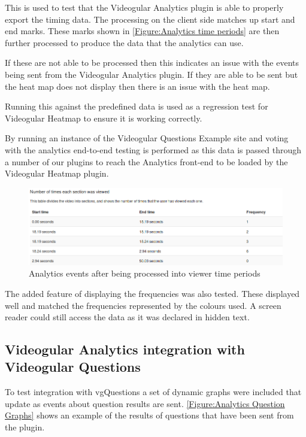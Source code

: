 This is used to test that the \gls{Videogular} Analytics plugin is able to properly export the timing data. The processing on the client side matches up start and end marks. These marks shown in \autoref{Figure:Analytics time periods} are then further processed to produce the data that the analytics can use.

If these are not able to be processed then this indicates an issue with the events being sent from the \gls{Videogular} Analytics plugin. If they are able to be sent but the heat map does not display then there is an issue with the heat map.

Running this against the predefined data is used as a regression test for \gls{Videogular} Heatmap to ensure it is working correctly.

By running an instance of the Videogular Questions Example site and voting with the analytics end-to-end testing is performed as this data is passed through a number of our plugins to reach the Analytics front-end to be loaded by the \gls{Videogular} Heatmap plugin.

\begin{figure}[h]
	\centering
		\includegraphics[scale=0.4]{../figures/analytics_time_periods.png}
	\caption{\label{Figure:Analytics time periods} Analytics events after being processed into viewer time periods}
\end{figure}

The added feature of displaying the frequencies was also tested. These displayed well and matched the frequencies represented by the colours used. A screen reader could still access the data as it was declared in hidden text.

\subsection{Videogular Analytics integration with Videogular Questions}

To test integration with \gls{vgQuestions} a set of dynamic graphs were included that update as events about question results are sent. \autoref{Figure:Analytics Question Graphs} shows an example of the results of questions that have been sent from the plugin.

